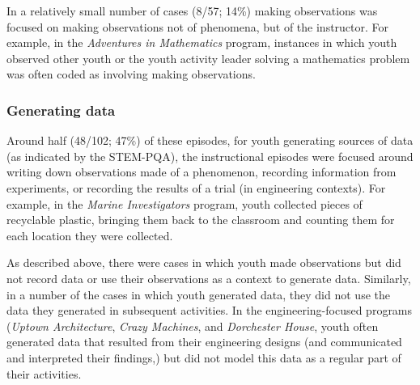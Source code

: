 \documentclass[]{book}
\theoremstyle{definition}
\theoremstyle{definition}
\theoremstyle{definition}
\theoremstyle{remark}
\begin{document}
In a relatively small number of cases (8/57; 14\%) making observations
was focused on making observations not of phenomena, but of the
instructor. For example, in the \emph{Adventures in Mathematics}
program, instances in which youth observed other youth or the youth
activity leader solving a mathematics problem was often coded as
involving making observations.

\subsubsection{Generating data}\label{generating-data}

Around half (48/102; 47\%) of these episodes, for youth generating
sources of data (as indicated by the STEM-PQA), the instructional
episodes were focused around writing down observations made of a
phenomenon, recording information from experiments, or recording the
results of a trial (in engineering contexts). For example, in the
\emph{Marine Investigators} program, youth collected pieces of
recyclable plastic, bringing them back to the classroom and counting
them for each location they were collected.

As described above, there were cases in which youth made observations
but did not record data or use their observations as a context to
generate data. Similarly, in a number of the cases in which youth
generated data, they did not use the data they generated in subsequent
activities. In the engineering-focused programs (\emph{Uptown
Architecture}, \emph{Crazy Machines}, and \emph{Dorchester House}, youth
often generated data that resulted from their engineering designs (and
communicated and interpreted their findings,) but did not model this
data as a regular part of their activities.
\end{document}

